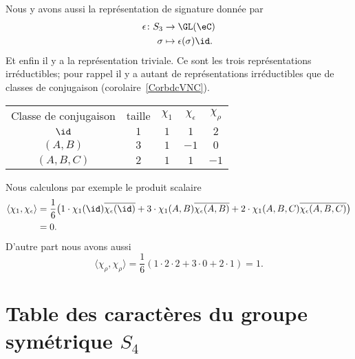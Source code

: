 Nous y avons aussi la représentation de signature donnée par
\begin{equation}
    \begin{aligned}
        \epsilon\colon S_3&\to \GL(\eC) \\
        \sigma&\mapsto \epsilon(\sigma)\id.
    \end{aligned}
\end{equation}
Et enfin il y a la représentation triviale. Ce sont les trois représentations irréductibles; pour rappel il y a autant de représentations irréductibles que de classes de conjugaison (corolaire~\ref{CorbdcVNC}).

\begin{center}
    \begin{tabular}[]{ccccc}
        Classe de conjugaison   &   taille  &   \( \chi_1\) &   \( \chi_{\epsilon}\)    &   $\chi_{\rho}$\\
         $\id$   &   $1$    &   $1$    &   $1$    &   $2$    \\
         \( (A,B)\)   &   $3$    &   $1$    &   $-1$    &   $0$    \\
         \( (A,B,C)\)   &   \( 2\)    &   \( 1\)    &   \( 1\)    &   $-1$    \\
    \end{tabular}
\end{center}

Nous calculons par exemple le produit scalaire
\begin{subequations}
    \begin{align}
        \langle \chi_1, \chi_{\epsilon}\rangle &=\frac{1}{ 6 }\big( 1\cdot\chi_1(\id)\overline{ \chi_{\epsilon}(\id) }+3\cdot \chi_1(A,B)\overline{ \chi_{\epsilon}(A,B) }+2\cdot \chi_1(A,B,C)\overline{ \chi_{\epsilon}(A,B,C) } \big)\\
        &=0.
    \end{align}
\end{subequations}
D'autre part nous avons aussi
\begin{equation}
    \langle \chi_{\rho}, \chi_{\rho}\rangle =\frac{1}{ 6 }(1\cdot2\cdot 2+3\cdot 0+2\cdot 1)=1.
\end{equation}

\section{Table des caractères du groupe symétrique \texorpdfstring{$ S_4$}{S4}}
\label{SecUMIgTmO}

